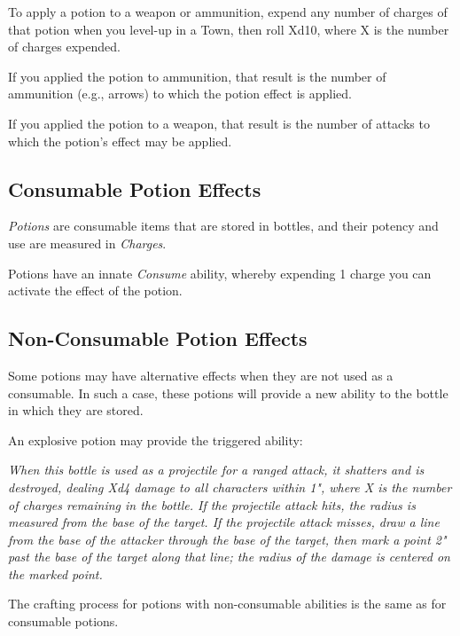 \vspace{0.4em}

To apply a potion to a weapon or ammunition, 
expend any number of charges of that potion when you level-up in a Town,
then roll Xd10, where X is the number of charges expended.

\vspace{0.4em}

If you applied the potion to ammunition, 
that result is the number of ammunition (e.g., arrows) to which the potion effect is applied.

\vspace{0.4em}

If you applied the potion to a weapon, 
that result is the number of attacks to which the potion's effect may be applied.


\subsection{Consumable Potion Effects}
\textit{Potions} are consumable items that are stored in bottles, 
and their potency and use are measured in \textit{Charges}. 

\vspace{0.4em}

Potions have an innate \textit{Consume} ability, 
whereby expending 1 charge you can activate the effect of the potion.


\subsection{Non-Consumable Potion Effects}
Some potions may have alternative effects when they are not used as a consumable.
In such a case, these potions will provide a new ability to the bottle in which they are stored.

\begin{Example}
  An explosive potion may provide the triggered ability:
  
  \vspace{0.4em}

  \textit{When this bottle is used as a projectile for a ranged attack, it shatters and is destroyed,
  dealing Xd4 damage to all characters within 1", where X is the number of charges remaining in the bottle.
  If the projectile attack hits, the radius is measured from the base of the target.
  If the projectile attack misses, draw a line from the base of the attacker through the base of the target,
  then mark a point 2" past the base of the target along that line; 
  the radius of the damage is centered on the marked point.}
\end{Example}

The crafting process for potions with non-consumable abilities is the same as for consumable potions.


